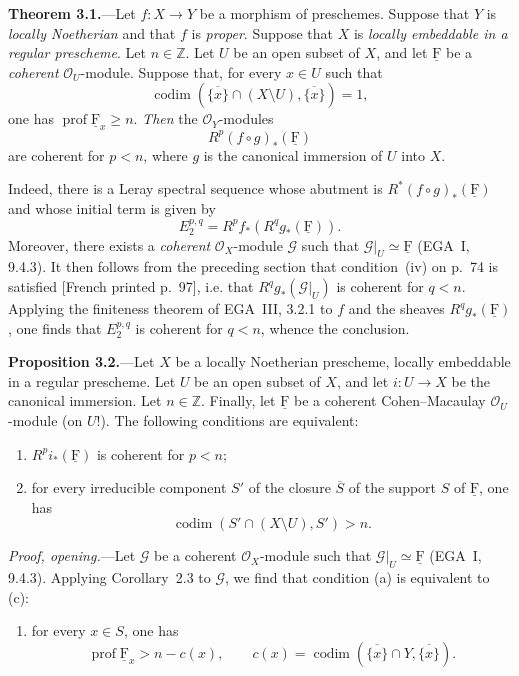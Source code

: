 \documentclass[10pt,a4paper]{article}
\newcommand{\uF}{\underline{\mathrm F}}
\newcommand{\cF}{\uF}
\newcommand{\cG}{\mathcal G}
\newcommand{\cO}{\mathcal O}
\newcommand{\prof}{\operatorname{prof}}
\newcommand{\codimn}{\operatorname{codim}}
\theoremstyle{sgatheorem}
\theoremstyle{plain}
\numberwithin{equation}{section}
\begin{document}
\medskip
\noindent\textbf{Theorem 3.1.}---Let $f\colon X\to Y$ be a morphism of
preschemes. Suppose that $Y$ is \emph{locally Noetherian} and that $f$ is
\emph{proper}. Suppose that $X$ is \emph{locally embeddable in a regular
prescheme}. Let $n\in\mathbb Z$. Let $U$ be an open subset of $X$, and let
$\cF$ be a \emph{coherent} $\cO_U$-module. Suppose that, for every $x\in U$
such that
\[
  \codimn(\overline{\{x\}}\cap(X\setminus U),
  \overline{\{x\}})=1,
\]
one has $\prof\cF_x\geq n$. \emph{Then} the $\cO_Y$-modules
\[
  R^p(f\circ g)_*(\cF)
\]
are coherent for $p<n$, where $g$ is the canonical immersion of $U$ into
$X$.

\medskip
\noindent Indeed, there is a Leray spectral sequence whose abutment is
$R^*(f\circ g)_*(\cF)$ and whose initial term is given by
\[
  E_2^{p,q}=R^p f_*(R^q g_*(\cF)).
\]
Moreover, there exists a \emph{coherent} $\cO_X$-module $\cG$ such that
$\cG|_U\simeq\cF$ (EGA~I, 9.4.3). It then follows from the preceding section
that condition~\textup{(iv)} on p.~74 is satisfied
{\scriptsize\color{gray}[French printed p.~97]}, i.e. that
$R^q g_*(\cG|_U)$ is coherent for $q<n$. Applying the finiteness theorem of
EGA~III, 3.2.1 to $f$ and the sheaves $R^q g_*(\cF)$, one finds that
$E_2^{p,q}$ is coherent for $q<n$, whence the conclusion.


\medskip
\noindent\textbf{Proposition 3.2.}---Let $X$ be a locally Noetherian
prescheme, locally embeddable in a regular prescheme. Let $U$ be an open
subset of $X$, and let $i\colon U\to X$ be the canonical immersion. Let
$n\in\mathbb Z$. Finally, let $\cF$ be a coherent Cohen--Macaulay
$\cO_U$-module (on $U$!). The following conditions are equivalent:
\begin{enumerate}
\item[(a)] $R^p i_*(\cF)$ is coherent for $p<n$;
\item[(b)] for every irreducible component $S'$ of the closure $\overline S$
of the support $S$ of $\cF$, one has
\[
  \codimn(S'\cap(X\setminus U),S')>n.
\]
\end{enumerate}


\medskip
\noindent\textit{Proof, opening.}---Let $\cG$ be a coherent $\cO_X$-module
such that $\cG|_U\simeq\cF$ (EGA~I, 9.4.3). Applying Corollary~2.3 to
$\cG$, we find that condition \textup{(a)} is equivalent to \textup{(c)}:
\begin{enumerate}
\item[(c)] for every $x\in S$, one has
\[
  \prof\cF_x>n-c(x),
  \qquad
  c(x)=\codimn(\overline{\{x\}}\cap Y,\overline{\{x\}}).
\]
\end{enumerate}
\end{document}
